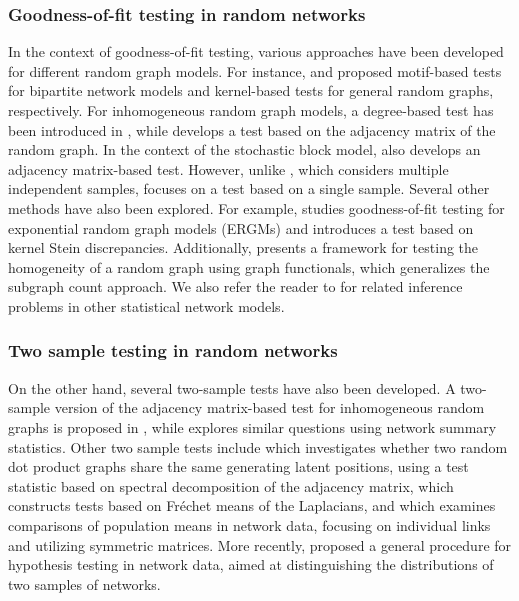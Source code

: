 \documentclass[12pt]{article}
\numberwithin{equation}{section}
\begin{document}
\subsubsection{Goodness-of-fit testing in random networks}In the context of goodness-of-fit testing, various approaches have been developed for different random graph models. For instance, \cite{ouadah2022motif} and \cite{maugis2020testing} proposed motif-based tests for bipartite network models and kernel-based tests for general random graphs, respectively. For inhomogeneous random graph models, a degree-based test has been introduced in \cite{oudah2020}, while \cite{dan2020goodness} develops a test based on the adjacency matrix of the random graph. In the context of the stochastic block model, \cite{GOF_sbm} also develops an adjacency matrix-based test. However, unlike \cite{dan2020goodness}, which considers multiple independent samples, \cite{GOF_sbm} focuses on a test based on a single sample. Several other methods have also been explored. For example, \cite{xu2021stein} studies goodness-of-fit testing for exponential random graph models (ERGMs) and introduces a test based on kernel Stein discrepancies. Additionally, \cite{brune2025goodness} presents a framework for testing the homogeneity of a random graph using graph functionals, which generalizes the subgraph count approach. We also refer the reader to \cite{bickel_sarkar,chatterjee2024higher,motif_fourth,networkminimaxrates,gao2017subgraph,comm_detec,gao2015rate} for related inference problems in other statistical network models.

\subsubsection{Two sample testing in random networks}On the other hand, several two-sample tests have also been developed. A two-sample version of the adjacency matrix-based test for inhomogeneous random graphs is proposed in \cite{dan2020goodness}, while \cite{ghoshdastidar2017networkstatistics} explores similar questions using network summary statistics. Other two sample tests include \cite{tang2017nonparametric}  which investigates whether two random dot product graphs share the same generating latent positions, using a test statistic based on spectral decomposition of the adjacency matrix, \cite{Ginestet2015} which constructs tests based on Fréchet means of the Laplacians, and  \cite{Li2022} which examines comparisons of population means in network data, focusing on individual links and utilizing symmetric matrices. More recently, \cite{chen2023} proposed a general procedure for hypothesis testing in network data, aimed at distinguishing the distributions of two samples of networks.\\
\end{document}
